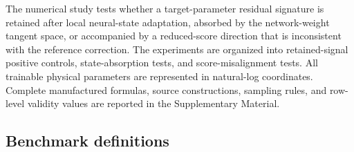 \documentclass[preprint,12pt]{elsarticle}
\begin{document}
The numerical study tests whether a target-parameter residual signature is retained after local neural-state adaptation, absorbed by the network-weight tangent space, or accompanied by a reduced-score direction that is inconsistent with the reference correction.  The experiments are organized into retained-signal positive controls, state-absorption tests, and score-misalignment tests.  All trainable physical parameters are represented in natural-log coordinates.  Complete manufactured formulas, source constructions, sampling rules, and row-level validity values are reported in the Supplementary Material.

\subsection{Benchmark definitions}
\end{document}
